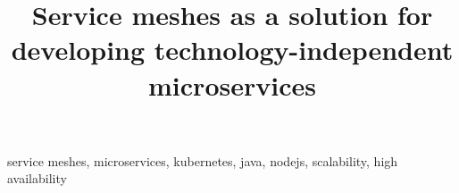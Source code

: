\documentclass[conference]{IEEEtran}
\begin{document}
\title{Service meshes as a solution for developing technology-independent microservices
}



\maketitle
\thispagestyle{plain}
\pagestyle{plain}



\begin{IEEEkeywords}
service meshes, microservices, kubernetes, java, nodejs, scalability, high availability
\end{IEEEkeywords}








\end{document}
